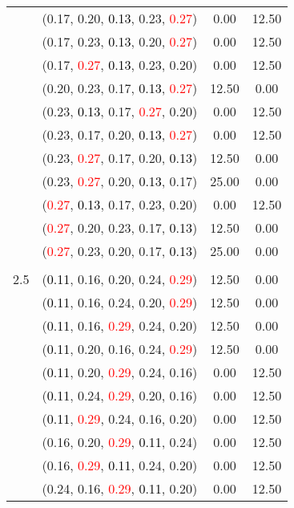 \documentclass[10pt,a4paper]{report}
\begin{document}
\begin{center}
\begin{longtable}{clcc}
			&(0.17, 0.20, \textcolor{black}{0.13}, 0.23, \textcolor{red}{0.27})&0.00&12.50\\
			&(0.17, 0.23, \textcolor{black}{0.13}, 0.20, \textcolor{red}{0.27})&0.00&12.50\\
			&(0.17, \textcolor{red}{0.27}, \textcolor{black}{0.13}, 0.23, 0.20)&0.00&12.50\\
			&(0.20, 0.23, 0.17, \textcolor{black}{0.13}, \textcolor{red}{0.27})&12.50&0.00\\
			&(0.23, \textcolor{black}{0.13}, 0.17, \textcolor{red}{0.27}, 0.20)&0.00&12.50\\
			&(0.23, 0.17, 0.20, \textcolor{black}{0.13}, \textcolor{red}{0.27})&0.00&12.50\\
			&(0.23, \textcolor{red}{0.27}, 0.17, 0.20, \textcolor{black}{0.13})&12.50&0.00\\
			&(0.23, \textcolor{red}{0.27}, 0.20, \textcolor{black}{0.13}, 0.17)&25.00&0.00\\
			&(\textcolor{red}{0.27}, \textcolor{black}{0.13}, 0.17, 0.23, 0.20)&0.00&12.50\\
			&(\textcolor{red}{0.27}, 0.20, 0.23, 0.17, \textcolor{black}{0.13})&12.50&0.00\\
			&(\textcolor{red}{0.27}, 0.23, 0.20, 0.17, \textcolor{black}{0.13})&25.00&0.00\\
		&&&\\
		2.5			&(\textcolor{black}{0.11}, 0.16, 0.20, 0.24, \textcolor{red}{0.29})&12.50&0.00\\
			&(\textcolor{black}{0.11}, 0.16, 0.24, 0.20, \textcolor{red}{0.29})&12.50&0.00\\
			&(\textcolor{black}{0.11}, 0.16, \textcolor{red}{0.29}, 0.24, 0.20)&12.50&0.00\\
			&(\textcolor{black}{0.11}, 0.20, 0.16, 0.24, \textcolor{red}{0.29})&12.50&0.00\\
			&(\textcolor{black}{0.11}, 0.20, \textcolor{red}{0.29}, 0.24, 0.16)&0.00&12.50\\
			&(\textcolor{black}{0.11}, 0.24, \textcolor{red}{0.29}, 0.20, 0.16)&0.00&12.50\\
			&(\textcolor{black}{0.11}, \textcolor{red}{0.29}, 0.24, 0.16, 0.20)&0.00&12.50\\
			&(0.16, 0.20, \textcolor{red}{0.29}, \textcolor{black}{0.11}, 0.24)&0.00&12.50\\
			&(0.16, \textcolor{red}{0.29}, \textcolor{black}{0.11}, 0.24, 0.20)&0.00&12.50\\
			&(0.24, 0.16, \textcolor{red}{0.29}, \textcolor{black}{0.11}, 0.20)&0.00&12.50\\

\end{longtable}
\end{center}
\end{document}

